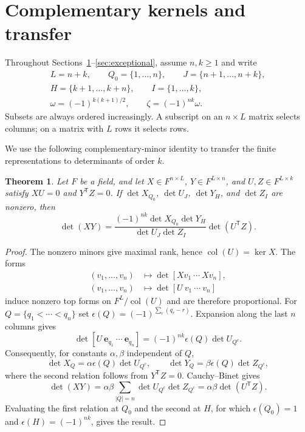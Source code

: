 \documentclass[12pt]{article}
\newtheorem{theorem}{Theorem}[section]
\numberwithin{equation}{section}
\newcommand{\eb}{\mathbf e}
\begin{document}
\section{Complementary kernels and transfer}\label{sec:transfer}

Throughout Sections~\ref{sec:transfer}--\ref{sec:exceptional}, assume
$n,k\ge1$ and write
\[
\begin{gathered}
 L=n+k,\qquad Q_0=\{1,\ldots,n\},\qquad J=\{n+1,\ldots,n+k\},\\
 H=\{k+1,\ldots,k+n\},\qquad I=\{1,\ldots,k\},\\
 \omega=(-1)^{k(k+1)/2},\qquad \zeta=(-1)^{nk}\omega.
\end{gathered}
\]
Subsets are always ordered increasingly.  A subscript on an
$n\times L$ matrix selects columns; on a matrix with $L$ rows it
selects rows.

We use the following complementary-minor identity to transfer the
finite representations to determinants of order $k$.

\begin{theorem}
Let $F$ be a field, and let $X\in F^{n\times L}$,
$Y\in F^{L\times n}$, and $U,Z\in F^{L\times k}$ satisfy $XU=0$ and $Y^{\mathsf T}Z=0$.
If $\det X_{Q_0}$, $\det U_J$, $\det Y_H$, and $\det Z_I$ are
nonzero, then
\[
 \det(XY)=
 \frac{(-1)^{nk}\det X_{Q_0}\det Y_H}
      {\det U_J\det Z_I}\det(U^{\mathsf T}Z).
\]
\end{theorem}

\begin{proof}
The nonzero minors give maximal rank, hence
$\operatorname{col}(U)=\ker X$.  The forms
\[
\begin{aligned}
 (v_1,\ldots,v_n)&\longmapsto\det[Xv_1\ \cdots\ Xv_n],\\
 (v_1,\ldots,v_n)&\longmapsto\det[U\ v_1\ \cdots\ v_n]
\end{aligned}
\]
induce nonzero top forms on $F^L/\operatorname{col}(U)$ and are
therefore proportional.  For $Q=\{q_1<\cdots<q_n\}$ set
$\epsilon(Q)=(-1)^{\sum_r(q_r-r)}$.  Expansion along the last $n$
columns gives
\[
 \det[U\ \eb_{q_1}\ \cdots\ \eb_{q_n}]
 =(-1)^{nk}\epsilon(Q)\det U_{Q^c}.
\]
Consequently, for constants $\alpha,\beta$ independent of $Q$,
\[
 \det X_Q=\alpha\epsilon(Q)\det U_{Q^c},\qquad
 \det Y_Q=\beta\epsilon(Q)\det Z_{Q^c},
\]
where the second relation follows from $Y^{\mathsf T}Z=0$.
Cauchy--Binet gives
\[
 \det(XY)=\alpha\beta
 \sum_{|Q|=n}\det U_{Q^c}\det Z_{Q^c}
 =\alpha\beta\det(U^{\mathsf T}Z).
\]
Evaluating the first relation at $Q_0$ and the second at $H$, for
which $\epsilon(Q_0)=1$ and $\epsilon(H)=(-1)^{nk}$, gives the result.
\end{proof}
\end{document}

